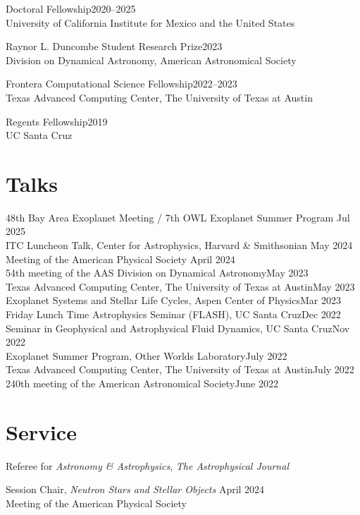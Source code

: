 \documentclass[12pt]{article}
\begin{document}
Doctoral Fellowship\hfill2020--2025\\
University of California Institute for Mexico and the United States

Raynor L. Duncombe Student Research Prize\hfill2023\\
Division on Dynamical Astronomy, American Astronomical Society

Frontera Computational Science Fellowship\hfill 2022--2023\\
Texas Advanced Computing Center, The University of Texas at Austin

Regents Fellowship\hfill 2019\\
UC Santa Cruz

\section{Talks}
48th Bay Area Exoplanet Meeting / 7th OWL Exoplanet Summer Program \hfill Jul 2025\\
ITC Luncheon Talk, Center for Astrophysics, Harvard \& Smithsonian \hfill May 2024\\
Meeting of the American Physical Society \hfill April 2024\\
54th meeting of the AAS Division on Dynamical Astronomy\hfill May 2023\\
Texas Advanced Computing Center, The University of Texas at Austin\hfill May 2023\\
Exoplanet Systems and Stellar Life Cycles, Aspen Center of Physics\hfill Mar 2023\\
Friday Lunch Time Astrophysics Seminar (FLASH), UC Santa Cruz\hfill Dec 2022\\
Seminar in Geophysical and Astrophysical Fluid Dynamics, UC Santa Cruz\hfill Nov 2022\\
Exoplanet Summer Program, Other Worlds Laboratory\hfill July 2022\\
Texas Advanced Computing Center, The University of Texas at Austin\hfill July 2022\\
240th meeting of the American Astronomical Society\hfill June 2022

\section{Service}
Referee for \textit{Astronomy \& Astrophysics}, \textit{The Astrophysical Journal}

Session Chair, \textit{Neutron Stars and Stellar Objects} \hfill April 2024\\
Meeting of the American Physical Society
\end{document}
